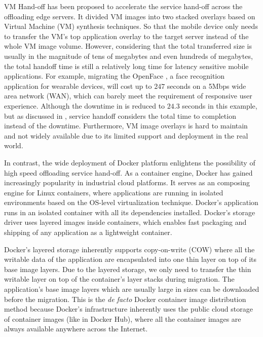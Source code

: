 VM Hand-off \cite{ha2015vmhandoff} has been proposed to accelerate the service hand-off across the offloading edge servers. It divided VM images into two stacked overlays based on Virtual Machine (VM) synthesis \cite{satya2009case} techniques. %
So that the mobile device only needs to transfer the VM's top application overlay to the target server instead of the whole VM image volume. However, considering that the total transferred size is usually in the magnitude of tens of megabytes and even hundreds of megabytes, the total handoff time is still a relatively long time for latency sensitive mobile applications. For example, migrating the OpenFace \cite{openface2016}, a face recognition application for wearable devices, will cost up to $247$ seconds on a 5Mbps wide area network (WAN), which can barely meet the requirement of responsive user experience. Although the downtime in \cite{ha2015vmhandoff} is reduced to $24.3$ seconds in this example, but as discussed in \cite{ha2015vmhandoff}, service handoff considers the total time to completion instead of the downtime. 
Furthermore, VM image overlays is hard to maintain and not widely available due to its limited support and deployment in the real world.

In contrast, the wide deployment of Docker platform enlightens the possibility of high speed offloading service hand-off. As a container engine, Docker has gained increasingly popularity in industrial cloud platforms. It serves as an composing engine for Linux containers, where applications are running in isolated environments based on the OS-level virtualization technique.
Docker's application runs in an isolated container with all its dependencies installed. Docker's storage driver uses layered images inside containers, which enables fast packaging and shipping of any application as a lightweight container. 

Docker's layered storage inherently supports copy-on-write (COW) where all the writable data of the application are encapsulated into one thin layer on top of its base image layers.
Due to the layered storage, we only need to transfer the thin writable layer on top of the container's layer stacks during migration. The application's base image layers which are usually large in sizes can be downloaded before the migration. 
This is the \textit{de facto} Docker container image distribution method because Docker's infrastructure inherently uses the public cloud storage of container images (like in Docker Hub\cite{dockerhub}), where all the container images are always available anywhere across the Internet. 

